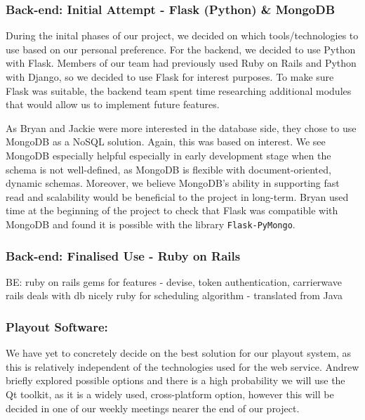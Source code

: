 \documentclass[a4paper, titlepage]{article}
\begin{document}
\subsubsection{Back-end: Initial Attempt - Flask (Python) \& MongoDB}

During the inital phases of our project, we decided on which tools/technologies to use based on our personal preference. For the backend, we decided to use Python with Flask. Members of our team had previously used Ruby on Rails and Python with Django, so we decided to use Flask for interest purposes. To make sure Flask was suitable, the backend team spent time researching additional modules that would allow us to implement future features.


As Bryan and Jackie were more interested in the database side, they chose to use MongoDB as a NoSQL solution. Again, this was based on interest. We see MongoDB especially helpful especially in early development stage when the schema is not well-defined, as MongoDB is flexible with document-oriented, dynamic schemas. Moreover, we believe MongoDB's ability in supporting fast read and scalability would be beneficial to the project in long-term. Bryan used time at the beginning of the project to check that Flask was compatible with MongoDB and found it is possible with the library \texttt{Flask-PyMongo}.



\subsubsection{Back-end: Finalised Use - Ruby on Rails} \label{sec:impl_RoR}

BE: 
  ruby on rails 
  gems for features - devise, token authentication, carrierwave
  rails deals with db nicely
  ruby for scheduling algorithm - translated from Java
  

\subsubsection{Playout Software: }

We have yet to concretely decide on the best solution for our playout system, as this is relatively independent of the technologies used for the web service. Andrew briefly explored possible options and there is a high probability we will use the Qt toolkit, as it is a widely used, cross-platform option, however this will be decided in one of our weekly meetings nearer the end of our project.
\end{document}
